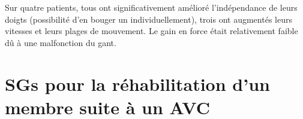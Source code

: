 		\begin{minipage}{\linewidth}
			\label{Boian_VR}
		\end{minipage}\medskip
		
		Sur quatre patients, tous ont significativement amélioré l'indépendance de leurs doigts (possibilité d'en bouger un individuellement), trois ont augmentés leurs vitesses et leurs plages de mouvement. Le gain en force était relativement faible dû à une malfonction du gant.

\section{SGs pour la réhabilitation d'un membre suite à un AVC}


